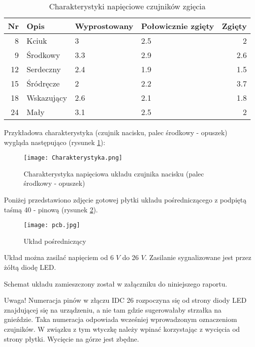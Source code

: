 \documentclass[10pt, a4paper]{article}
\begin{document}
\begin{table}[htbp]
  \centering
  \caption{Charakterystyki napięciowe czujników zgięcia}
    \begin{tabular}{rlllr}
    \toprule
    \multicolumn{1}{l}{Nr} & Opis  & Wyprostowany & Połowicznie zgięty & Zgięty \\
    \midrule
    8     & Kciuk & 3 & 2.5   & 2 \\
    9     & Środkowy & 3.3   & 2.9   & 2.6 \\
    12    & Serdeczny & 2.4   & 1.9   & 1.5 \\
    15    & Śródręcze & 2 & 2.2   & 3.7 \\
    18    & Wskazujący & 2.6   & 2.1   & 1.8 \\
    24    & Mały  & 3.1   & 2.5   & 2 \\
	\bottomrule
    \end{tabular}%
  \label{tab:nap_zgiecie}%
\end{table}%

Przykładowa charakterystyka (czujnik nacisku, palec środkowy - opuszek) wygląda następująco (rysunek \ref{charakterystyka}):

\begin{figure}[H]
\begin{center}
\texttt{[image: Charakterystyka.png]}
\caption{Charakterystyka napięciowa układu czujnika nacisku (palec środkowy - opuszek)}
\label{charakterystyka}
\end{center}
\end{figure}

Poniżej przedstawiono zdjęcie gotowej płytki układu pośredniczącego z podpiętą taśmą 40 - pinową (rysunek \ref{pcb}).

\begin{figure}[h!]
\texttt{[image: pcb.jpg]}
\caption{Układ pośredniczący}
\label{pcb}
\end{figure}

Układ można zasilać napięciem od 6 $V$ do 26 $V$. Zasilanie sygnalizowane jest przez żółtą diodę LED.

Schemat układu zamieszczony został w załączniku do niniejszego raportu.

Uwaga! Numeracja pinów w złączu IDC 26 rozpoczyna się od strony diody LED znajdującej się na urządzeniu, a nie tam gdzie sugerowałaby strzałka na gnieździe. Taka numeracja odpowiada wcześniej wprowadzonym oznaczeniom czujników. W związku z tym wtyczkę należy wpinać korzystając z wycięcia od strony płytki. Wycięcie na górze jest zbędne.
\end{document}

